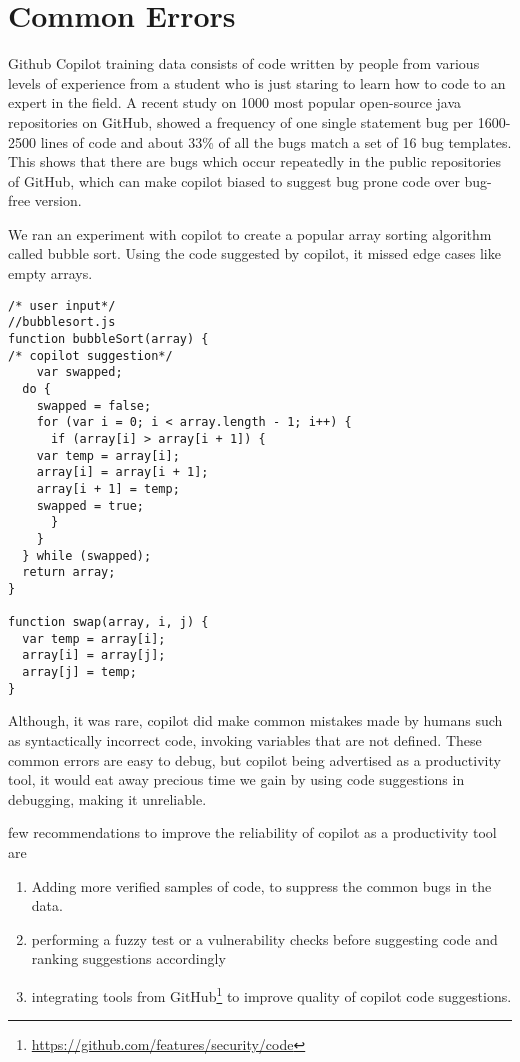 \section{Common Errors}
Github Copilot\cite{copilot} training data consists of code written by people from various levels of experience from a student who is just staring to learn how to code to an expert in the field. A recent study \cite{github_bugs} on 1000 most popular open-source java repositories on GitHub, showed a frequency of one single statement bug per 1600-2500 lines of code and about 33\% of all the bugs match a set of 16 bug templates. This shows that there are bugs which occur repeatedly in the public repositories of GitHub, which can make copilot biased to suggest bug prone code over bug-free version.

We ran an experiment with copilot to create a popular array sorting algorithm called bubble sort. Using the code suggested by copilot, it missed edge cases like empty arrays.
\begin{lstlisting}[caption=BubbleSort algorithm suggested by Copilot]
/* user input*/
//bubblesort.js
function bubbleSort(array) {
/* copilot suggestion*/
	var swapped;
  do {
    swapped = false;
    for (var i = 0; i < array.length - 1; i++) {
      if (array[i] > array[i + 1]) {
	var temp = array[i];
	array[i] = array[i + 1];
	array[i + 1] = temp;
	swapped = true;
      }
    }
  } while (swapped);
  return array;
}

function swap(array, i, j) {
  var temp = array[i];
  array[i] = array[j];
  array[j] = temp;
}
\end{lstlisting}
Although, it was rare, copilot did make common mistakes made by humans such as syntactically incorrect code, invoking variables that are not defined. These common errors are easy to debug, but copilot being advertised as a productivity tool, it would eat away precious time we gain by using code suggestions in debugging, making it unreliable.

few recommendations to improve the reliability of copilot as a productivity tool are
\begin{enumerate}
    \item Adding more verified samples of code, to suppress the common bugs in the data.
    \item performing a fuzzy test or a vulnerability checks before suggesting code and ranking suggestions accordingly
    \item integrating tools from GitHub\footnote{\url{https://github.com/features/security/code}} to improve quality of copilot code suggestions.
\end{enumerate}